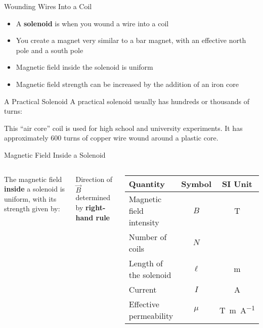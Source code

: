 \documentclass[12pt,aspectratio=169]{beamer}
\begin{document}
\begin{frame}{Wounding Wires Into a Coil}
  \begin{itemize}
  \item A \textbf{solenoid} is when you wound a wire into a coil
  \item You create a magnet very similar to a bar magnet, with an effective
    north pole and a south pole
  \item Magnetic field inside the solenoid is uniform
  \item Magnetic field strength can be increased by the addition of an iron core
  \end{itemize}
  \begin{center}
  \end{center}
\end{frame}



\begin{frame}{A Practical Solenoid}
  A practical solenoid usually has hundreds or thousands of turns:
  \begin{center}
  \end{center}

  \vspace{-.2in}
  This ``air core'' coil is used for high school and university experiments. It
  has approximately 600 turns of copper wire wound around a plastic core.
\end{frame}



\begin{frame}{Magnetic Field Inside a Solenoid}
  \begin{columns}
    
    The magnetic field \textbf{inside} a solenoid is uniform, with its strength
    given by:
    
    
    Direction of $\vec B$ determined by \textbf{right-hand rule}
    \begin{center}
      \begin{tabular}{l|c|c}
        \rowcolor{pink}
        \textbf{Quantity} & \textbf{Symbol} & \textbf{SI Unit} \\ \hline
        Magnetic field intensity & $B$    & \si\tesla \\
        Number of coils          & $N$    & \\
        Length of the solenoid   & $\ell$ & \si\metre \\
        Current                  & $I$    & \si\ampere \\
        Effective permeability   & $\mu$  & \si{\tesla.\metre\per\ampere}
      \end{tabular}
    \end{center}
  \end{columns}
\end{frame}
\end{document}
